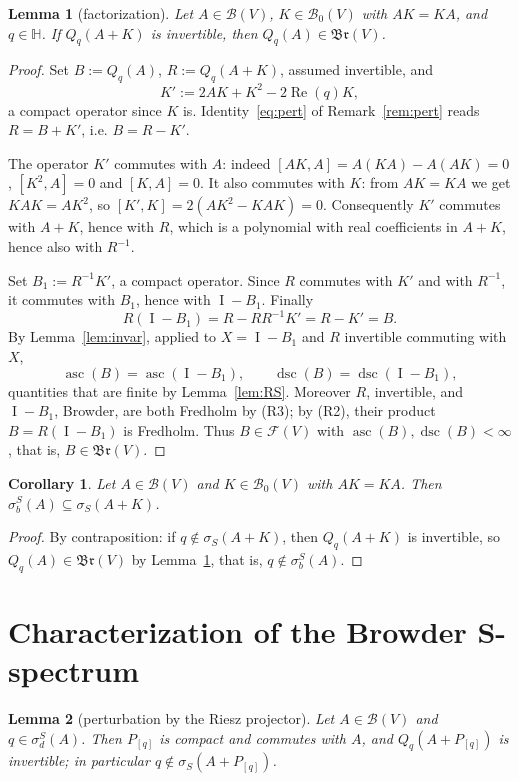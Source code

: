 \documentclass[11pt,a4paper]{article}
\theoremstyle{plain}
\newtheorem{lemma}{Lemma}[section]
\newtheorem{corollary}{Corollary}[section]
\theoremstyle{remark}
\newcommand{\HH}{\mathbb H}
\newcommand{\V}{V}
\newcommand{\B}{\mathcal B}
\newcommand{\Bo}{\mathcal B_0}
\newcommand{\F}{\mathcal F}
\newcommand{\Br}{\mathfrak{Br}}
\newcommand{\sS}{\sigma_S}
\newcommand{\sigb}{\sigma_b^S}
\newcommand{\sd}{\sigma_d^S}
\DeclareMathOperator{\asc}{asc}
\DeclareMathOperator{\dsc}{dsc}
\DeclareMathOperator{\Id}{I}
\newcommand{\Qq}[1]{Q_q(#1)}
\begin{document}
\begin{lemma}[factorization]\label{lem:fact}
Let $A\in\B(\V)$, $K\in\Bo(\V)$ with $AK=KA$, and $q\in\HH$. If $\Qq{A+K}$ is invertible, then $\Qq{A}\in\Br(\V)$.
\end{lemma}

\begin{proof}
Set $B:=\Qq{A}$, $R:=\Qq{A+K}$, assumed invertible, and
\[
K':=2AK+K^2-2\operatorname{Re}(q)K,
\]
a compact operator since $K$ is. Identity~\eqref{eq:pert} of Remark~\ref{rem:pert} reads $R=B+K'$, i.e. $B=R-K'$.

The operator $K'$ commutes with $A$: indeed $[AK,A]=A(KA)-A(AK)=0$, $[K^2,A]=0$ and $[K,A]=0$. It also commutes with $K$: from $AK=KA$ we get $KAK=AK^2$, so $[K',K]=2(AK^2-KAK)=0$. Consequently $K'$ commutes with $A+K$, hence with $R$, which is a polynomial with real coefficients in $A+K$, hence also with $R^{-1}$.

Set $B_1:=R^{-1}K'$, a compact operator. Since $R$ commutes with $K'$ and with $R^{-1}$, it commutes with $B_1$, hence with $\Id-B_1$. Finally
\[
R(\Id-B_1)=R-RR^{-1}K'=R-K'=B.
\]
By Lemma~\ref{lem:invar}, applied to $X=\Id-B_1$ and $R$ invertible commuting with $X$,
\[
\asc(B)=\asc(\Id-B_1),\qquad \dsc(B)=\dsc(\Id-B_1),
\]
quantities that are finite by Lemma~\ref{lem:RS}. Moreover $R$, invertible, and $\Id-B_1$, Browder, are both Fredholm by (R3); by (R2), their product $B=R(\Id-B_1)$ is Fredholm. Thus $B\in\F(\V)$ with $\asc(B),\dsc(B)<\infty$, that is, $B\in\Br(\V)$.
\end{proof}

\begin{corollary}\label{cor:stab}
Let $A\in\B(\V)$ and $K\in\Bo(\V)$ with $AK=KA$. Then $\sigb(A)\subseteq\sS(A+K)$.
\end{corollary}

\begin{proof}
By contraposition: if $q\notin\sS(A+K)$, then $\Qq{A+K}$ is invertible, so $\Qq{A}\in\Br(\V)$ by Lemma~\ref{lem:fact}, that is, $q\notin\sigb(A)$.
\end{proof}

\section{Characterization of the Browder S-spectrum}\label{sec:charac}

\begin{lemma}[perturbation by the Riesz projector]\label{lem:proj}
Let $A\in\B(\V)$ and $q\in\sd(A)$. Then $P_{[q]}$ is compact and commutes with $A$, and $\Qq{A+P_{[q]}}$ is invertible; in particular $q\notin\sS(A+P_{[q]})$.
\end{lemma}
\end{document}

